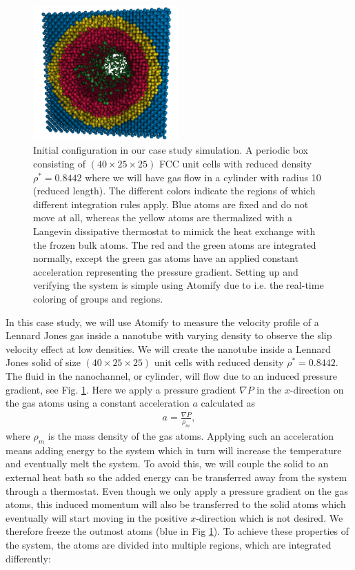 \documentclass[aps,pre,twocolumn,letterpaper,floatfix,nofootinbib]{revtex4}
\begin{document}
\begin{figure}
	\centering
	\includegraphics[width=0.5\textwidth]{lj_flow/configuration.png}
	\caption{
		Initial configuration in our case study simulation.
		A periodic box consisting of $(40\times25\times25)$ FCC unit cells with reduced density $\rho^* = 0.8442$ where we will have gas flow in a cylinder with radius 10 (reduced length).
		The different colors indicate the regions of which different integration rules apply.
		\textcolor{atomify-blue}{Blue} atoms are fixed and do not move at all,
		whereas the \textcolor{atomify-yellow}{yellow} atoms are thermalized with a Langevin\citep{schneider1978molecular} dissipative thermostat to mimick the heat exchange with the frozen bulk atoms.
		The \textcolor{atomify-red}{red} and the \textcolor{atomify-green}{green} atoms are integrated normally, except the \textcolor{atomify-green}{green} gas atoms have an applied constant acceleration representing the pressure gradient.
		Setting up and verifying the system is simple using Atomify due to i.e. the real-time coloring of groups and regions.
    }
	\label{fig:cylinder_simulation}
\end{figure}

In this case study, we will use Atomify to measure the velocity profile of a Lennard Jones gas inside a nanotube with varying density to observe the slip velocity effect at low densities.
We will create the nanotube inside a Lennard Jones solid of size  $(40\times25\times25)$ unit cells with reduced density $\rho^* = 0.8442$. The fluid in the nanochannel, or cylinder, will flow due to an induced pressure gradient, see Fig. \ref{fig:cylinder_simulation}.
Here we apply a pressure gradient $\nabla P$ in the $x$-direction on the gas atoms using a constant acceleration $a$ calculated as
\begin{align}
	a = \frac{\nabla P}{\rho_m},
\end{align}
where $\rho_m$ is the mass density of the gas atoms.
Applying such an acceleration means adding energy to the system which in turn will increase the temperature and eventually melt the system.
To avoid this, we will couple the solid to an external heat bath so the added energy can be transferred away from the system through a thermostat.
Even though we only apply a pressure gradient on the gas atoms, this induced momentum will also be transferred to the solid atoms which eventually will start moving in the positive $x$-direction which is not desired.
We therefore freeze the outmost atoms (blue in Fig \ref{fig:cylinder_simulation}).
To achieve these properties of the system, the atoms are divided into multiple regions, which are integrated differently:
\end{document}
